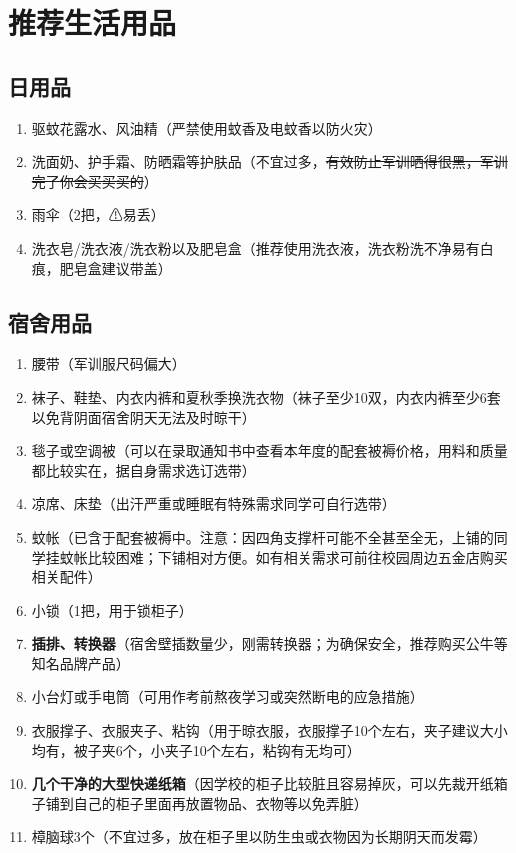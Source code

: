 \section[推荐生活用品]{推荐生活用品}

\subsection[日用品]{日用品}
\begin{enumerate}
    \item 驱蚊花露水、风油精（严禁使用蚊香及电蚊香以防火灾）
    \item 洗面奶、护手霜、防晒霜等护肤品（不宜过多，\sout{有效防止军训晒得很黑，军训完了你会买买买的}）
    \item 雨伞（2把，⚠易丢）
    \item 洗衣皂/洗衣液/洗衣粉以及肥皂盒（推荐使用洗衣液，洗衣粉洗不净易有白痕，肥皂盒建议带盖）
\end{enumerate}

\subsection[宿舍用品]{宿舍用品}
\begin{enumerate}
    \item 腰带（军训服尺码偏大）
    \item 袜子、鞋垫、内衣内裤和夏秋季换洗衣物（袜子至少10双，内衣内裤至少6套以免背阴面宿舍阴天无法及时晾干）
    \item 毯子或空调被（可以在录取通知书中查看本年度的配套被褥\footnotemark 价格，用料和质量都比较实在，据自身需求选订选带）
    \item 凉席、床垫\footnotemark（出汗严重或睡眠有特殊需求同学可自行选带）
    \item 蚊帐（已含于配套被褥中。注意：因四角支撑杆可能不全甚至全无，上铺的同学挂蚊帐比较困难；下铺相对方便。如有相关需求可前往校园周边五金店购买相关配件）
    \item 小锁（1把，用于锁柜子）
    \item \textbf{插排、转换器}（宿舍壁插数量少，刚需转换器；为确保安全，推荐购买公牛等知名品牌产品）
    \item 小台灯或手电筒（可用作考前熬夜学习或突然断电的应急措施）
    \item 衣服撑子、衣服夹子、粘钩（用于晾衣服，衣服撑子10个左右，夹子建议大小均有，被子夹6个，小夹子10个左右，粘钩有无均可）
    \item \textbf{几个干净的大型快递纸箱}（因学校的柜子比较脏且容易掉灰，可以先裁开纸箱子铺到自己的柜子里面再放置物品、衣物等以免弄脏）
    \item 樟脑球3个（不宜过多，放在柜子里以防生虫或衣物因为长期阴天而发霉）
\end{enumerate}

